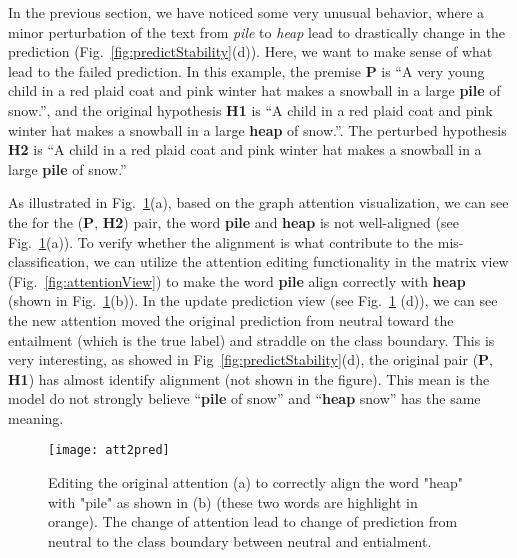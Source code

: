 In the previous section, we have noticed some very unusual behavior, where a minor perturbation of the text from \emph{pile} to \emph{heap} lead to drastically change in the prediction (Fig.~\ref{fig:predictStability}(d)). Here, we want to make sense of what lead to the failed prediction. In this example, the premise \textbf{P} is ``A very young child in a red plaid coat and pink winter hat makes a snowball in a large \textbf{pile} of snow.'', and the original hypothesis \textbf{H1} is ``A child in a red plaid coat and pink winter hat makes a snowball in a large \textbf{heap} of snow.''. The perturbed hypothesis \textbf{H2} is ``A child in a red plaid coat and pink winter hat makes a snowball in a large \textbf{pile} of snow.''

As illustrated in Fig.~\ref{fig:att2pred}(a), based on the graph attention visualization, we can see the for the (\textbf{P}, \textbf{H2}) pair, the word \textbf{pile} and \textbf{heap} is not well-aligned (see Fig.~\ref{fig:att2pred}(a)). 
%
To verify whether the alignment is what contribute to the mis-classification, we can utilize the attention editing functionality in the matrix view (Fig.~\ref{fig:attentionView}) to make the word \textbf{pile} align correctly with \textbf{heap} (shown in Fig.~\ref{fig:att2pred}(b)). 
%
In the update prediction view (see Fig.~\ref{fig:att2pred} (d)), we can see the new attention moved the original prediction from neutral toward the entailment (which is the true label) and straddle on the class boundary. This is very interesting, as showed in Fig~\ref{fig:predictStability}(d), the original pair (\textbf{P}, \textbf{H1}) has almost identify alignment (not shown in the figure). This mean is the model do not strongly believe ``\textbf{pile} of snow'' and ``\textbf{heap} snow'' has the same meaning.

\begin{figure}[htbp]
\centering
\vspace{-2mm}
 \texttt{[image: att2pred]}
 \caption{
Editing the original attention (a) to correctly align the word "heap" with "pile" as shown in (b) (these two words are highlight in orange).  
The change of attention lead to change of prediction from neutral to the class boundary between neutral and entialment.
%
}
\label{fig:att2pred}
\end{figure}



